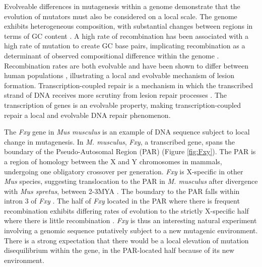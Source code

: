 Evolveable differences in mutagenesis within a genome demonstrate that the evolution of mutators must also be considered on a local scale. The genome exhibits heterogeneous composition, with substantial changes between regions in terms of GC content \citep{Bernardi1989TheGenome, Bernardi2000IsochoresVertebrates}. A high rate of recombination has been associated with a high rate of mutation to create GC base pairs, implicating recombination as a determinant of observed compositional difference within the genome \citep{Montoya-Burgos2003RecombinationGenomes, Duret2006AEvolution}. Recombination rates are both evolvable and have been shown to differ between human populations \citep{Wegmann2011RecombinationInference}, illustrating a local and evolvable mechanism of lesion formation. Transcription-coupled repair is a mechanism in which the transcribed strand of DNA receives more scrutiny from lesion repair processes \citep{Touchon2003Transcription-coupledGenome}. The transcription of genes is an evolvable property, making transcription-coupled repair a local and evolvable DNA repair phenomenon. 

The \textit{Fxy} gene in \textit{Mus musculus} is an example of DNA sequence subject to local change in mutagenesis. In \textit{M. musculus}, \textit{Fxy}, a transcribed gene, spans the boundary of the \gls{Pseudo-Autosomal Region} (PAR) \citep{Palmer1997AMice} (Figure \ref{fig:Fxy}). The PAR is a region of homology between the X and Y chromosomes in mammals, undergoing one obligatory crossover per generation. \textit{Fxy} is X-specific in other \textit{Mus} species, suggesting translocation to the PAR in \textit{M. musculus} after divergence with \textit{Mus spretus}, between 2-3MYA \citep{Huang2005HowMammals}. The boundary to the PAR falls within intron 3 of \textit{Fxy} \citep{Palmer1997AMice}. The half of \textit{Fxy} located in the PAR where there is frequent recombination exhibits differing rates of evolution to the strictly X-specific half where there is little recombination \citep{Perry1999EvolutionaryPosition}. \textit{Fxy} is thus an interesting natural experiment involving a genomic sequence putatively subject to a new mutagenic environment. There is a strong expectation that there would be a local elevation of mutation disequilibrium within the gene, in the PAR-located half because of its new environment. 




